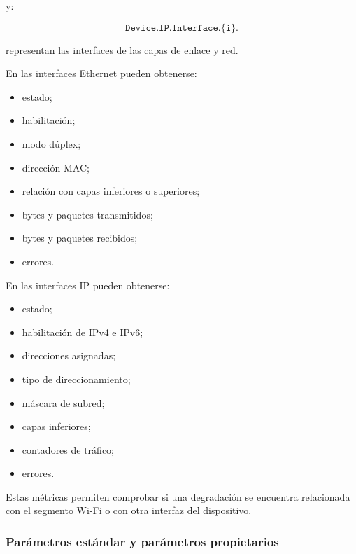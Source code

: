 y:

\[
    \texttt{Device.IP.Interface.\{i\}.}
\]

representan las interfaces de las capas de enlace y red.

En las interfaces Ethernet pueden obtenerse:

\begin{itemize}
    \item estado;

    \item habilitación;

    \item modo dúplex;

    \item dirección MAC;

    \item relación con capas inferiores o superiores;

    \item bytes y paquetes transmitidos;

    \item bytes y paquetes recibidos;

    \item errores.
\end{itemize}

En las interfaces IP pueden obtenerse:

\begin{itemize}
    \item estado;

    \item habilitación de IPv4 e IPv6;

    \item direcciones asignadas;

    \item tipo de direccionamiento;

    \item máscara de subred;

    \item capas inferiores;

    \item contadores de tráfico;

    \item errores.
\end{itemize}

Estas métricas permiten comprobar si una degradación se encuentra
relacionada con el segmento Wi-Fi o con otra interfaz del dispositivo.


\subsubsection*{Parámetros estándar y parámetros propietarios}

